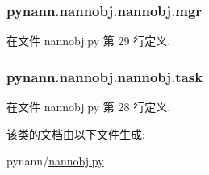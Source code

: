 \subsubsection[{mgr}]{\setlength{\rightskip}{0pt plus 5cm}pynann.\+nannobj.\+nannobj.\+mgr}\label{classpynann_1_1nannobj_1_1nannobj_a229bbc527a5a430ecc8ee8c43338c23a}


在文件 nannobj.\+py 第 29 行定义.

\hypertarget{classpynann_1_1nannobj_1_1nannobj_a5b09b8c742e7d696bdb2e976d6618355}{}
\subsubsection[{task}]{\setlength{\rightskip}{0pt plus 5cm}pynann.\+nannobj.\+nannobj.\+task}\label{classpynann_1_1nannobj_1_1nannobj_a5b09b8c742e7d696bdb2e976d6618355}


在文件 nannobj.\+py 第 28 行定义.



该类的文档由以下文件生成\+:\begin{DoxyCompactItemize}
\item 
pynann/\hyperlink{pynann_2nannobj_8py}{nannobj.\+py}\end{DoxyCompactItemize}
